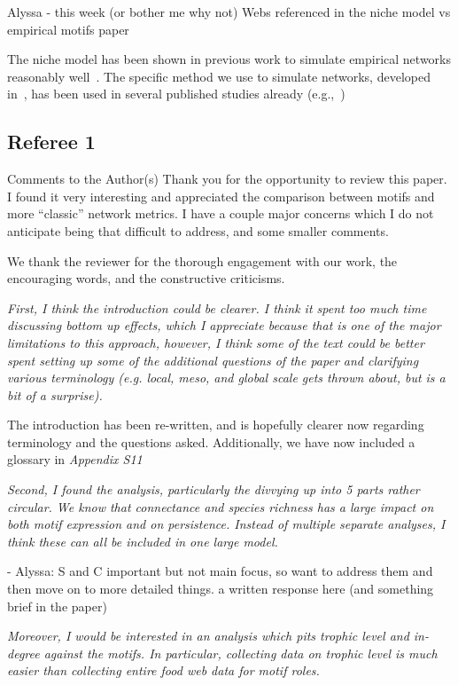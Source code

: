\documentclass[12pt]{article}
\newcommand{\us}{\rm \setlength{\leftskip}{0.3cm} \setlength{\rightskip}{0.3cm}}
\newcommand{\them}{\it \setlength{\leftskip}{0cm} \setlength{\rightskip}{0cm}}
\begin{document}
\us
Alyssa - this week (or bother me why not)
Webs referenced in the niche model vs empirical motifs paper

The niche model has been shown in previous work to simulate empirical networks reasonably well~\citep{Stouffer2005a,Stouffer2006}.
The specific method we use to simulate networks, developed in~\citet{Delmas2017}, has been used in several published studies already (e.g.,~\citep{})



\subsection*{Referee 1}

Comments to the Author(s)
Thank you for the opportunity to review this paper. I found it very interesting and appreciated the comparison between motifs and more “classic” network metrics. I have a couple major concerns which I do not anticipate being that difficult to address, and some smaller comments.

\us
We thank the reviewer for the thorough engagement with our work, the encouraging words, and the constructive criticisms. 

\them
First, I think the introduction could be clearer. I think it spent too much time discussing bottom up effects, which I appreciate because that is one of the major limitations to this approach, however, I think some of the text could be better spent setting up some of the additional questions of the paper and clarifying various terminology (e.g. local, meso, and global scale gets thrown about, but is a bit of a surprise).

\us
The introduction has been re-written, and is hopefully clearer now regarding terminology and the questions asked. Additionally, we have now included a glossary in \emph{Appendix S11}

\them
Second, I found the analysis, particularly the divvying up into 5 parts rather circular. We know that connectance and species richness has a large impact on both motif expression and on persistence. Instead of multiple separate analyses, I think these can all be included in one large model. 

\us - Alyssa: S and C important but not main focus, so want to address them and then move on to more detailed things.
a written response here (and something brief in the paper)

\them
Moreover, I would be interested in an analysis which pits trophic level and in-degree against the motifs. In particular, collecting data on trophic level is much easier than collecting entire food web data for motif roles.
\end{document}
